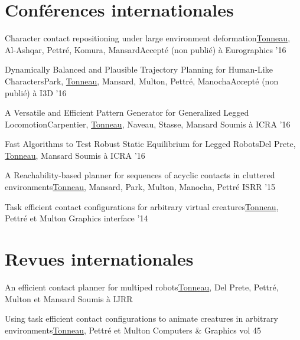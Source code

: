 \documentclass{tccv}
\begin{document}
\section{Conf\'erences internationales}
\begin{eventlist}

\item
     {\small{Character contact repositioning under large environment deformation}}{\small{\underline{Tonneau}, Al-Ashqar, Pettr\'e, Komura, Mansard}}{
{\small{Accept\'e (non publi\'e) \`a Eurographics '16}}} 


\item
     {\small{Dynamically Balanced and Plausible Trajectory Planning for Human-Like Characters}}{\small{Park, \underline{Tonneau}, Mansard, Multon, Pettr\'e, Manocha}}{
{\small{Accept\'e (non publi\'e) \`a I3D '16}}} 


\item
     {\small{A Versatile and Efficient Pattern Generator for Generalized Legged Locomotion}}{\small{Carpentier, \underline{Tonneau}, Naveau, Stasse, Mansard}}{
\small{Soumis \`a ICRA '16}} 

\item
     {\small{Fast Algorithms to Test Robust Static Equilibrium for Legged Robots}}{\small{Del Prete, \underline{Tonneau}, Mansard}}{
\small{Soumis \`a ICRA '16}} 

\item
     {\small{A Reachability-based planner for sequences of acyclic contacts in cluttered environments}}{\small{\underline{Tonneau}, Mansard, Park, Multon, Manocha, Pettr\'e}}{
\small{ISRR '15}} 

\item
     {\small{Task efficient contact configurations for arbitrary virtual creatures}}{\small{\underline{Tonneau}, Pettr\'e et Multon}}{
\small{Graphics interface '14}} 
\end{eventlist}
\section{Revues internationales}
\begin{eventlist}

\item
     {\small{An efficient contact planner for multiped robots}}{\small{\underline{Tonneau}, Del Prete, Pettr\'e, Multon et Mansard}}{
\small{Soumis \`a  IJRR}} 

\item
     {\small{Using task efficient contact configurations to animate creatures in arbitrary environments}}{\small{\underline{Tonneau}, Pettr\'e et Multon}}{
\small{Computers \& Graphics vol 45} }

\end{eventlist}
\end{document}
